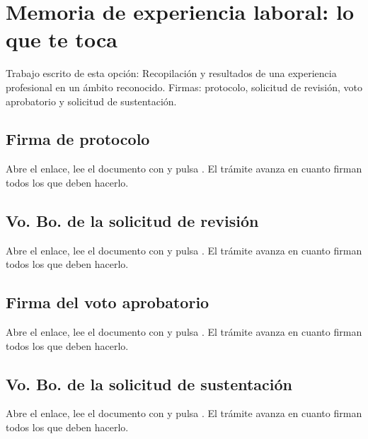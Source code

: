 \section{Memoria de experiencia laboral: lo que te toca}
Trabajo escrito de esta opción: Recopilación y resultados de una experiencia profesional en un ámbito reconocido. Firmas: protocolo, solicitud de revisión, voto aprobatorio y solicitud de sustentación.
\subsection{Firma de protocolo}
Abre el enlace, lee el documento con  y pulsa . El trámite avanza en cuanto firman todos los que deben hacerlo.
\subsection{Vo. Bo. de la solicitud de revisión}
Abre el enlace, lee el documento con  y pulsa . El trámite avanza en cuanto firman todos los que deben hacerlo.
\subsection{Firma del voto aprobatorio}
Abre el enlace, lee el documento con  y pulsa . El trámite avanza en cuanto firman todos los que deben hacerlo.
\subsection{Vo. Bo. de la solicitud de sustentación}
Abre el enlace, lee el documento con  y pulsa . El trámite avanza en cuanto firman todos los que deben hacerlo.
